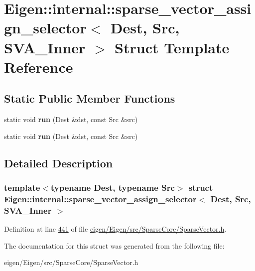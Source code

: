 \hypertarget{struct_eigen_1_1internal_1_1sparse__vector__assign__selector_3_01_dest_00_01_src_00_01_s_v_a___inner_01_4}{}\section{Eigen\+:\+:internal\+:\+:sparse\+\_\+vector\+\_\+assign\+\_\+selector$<$ Dest, Src, S\+V\+A\+\_\+\+Inner $>$ Struct Template Reference}
\label{struct_eigen_1_1internal_1_1sparse__vector__assign__selector_3_01_dest_00_01_src_00_01_s_v_a___inner_01_4}
\subsection*{Static Public Member Functions}
\begin{DoxyCompactItemize}
\item 
\mbox{\label{struct_eigen_1_1internal_1_1sparse__vector__assign__selector_3_01_dest_00_01_src_00_01_s_v_a___inner_01_4_affecf3f90481f6ce52db7192052a0320}} 
static void {\bfseries run} (Dest \&dst, const Src \&src)
\item 
\mbox{\label{struct_eigen_1_1internal_1_1sparse__vector__assign__selector_3_01_dest_00_01_src_00_01_s_v_a___inner_01_4_affecf3f90481f6ce52db7192052a0320}} 
static void {\bfseries run} (Dest \&dst, const Src \&src)
\end{DoxyCompactItemize}


\subsection{Detailed Description}
\subsubsection*{template$<$typename Dest, typename Src$>$\newline
struct Eigen\+::internal\+::sparse\+\_\+vector\+\_\+assign\+\_\+selector$<$ Dest, Src, S\+V\+A\+\_\+\+Inner $>$}



Definition at line \hyperlink{eigen_2_eigen_2src_2_sparse_core_2_sparse_vector_8h_source_l00441}{441} of file \hyperlink{eigen_2_eigen_2src_2_sparse_core_2_sparse_vector_8h_source}{eigen/\+Eigen/src/\+Sparse\+Core/\+Sparse\+Vector.\+h}.



The documentation for this struct was generated from the following file\+:\begin{DoxyCompactItemize}
\item 
eigen/\+Eigen/src/\+Sparse\+Core/\+Sparse\+Vector.\+h\end{DoxyCompactItemize}
